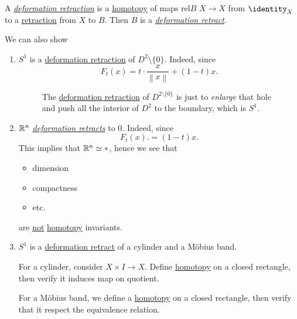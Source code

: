 \begin{prev}
	A \hyperref[def:deformation-retraction]{\emph{deformation retraction}} is a \hyperref[def:homotopy]{homotopy}
	of maps \(\mathrm{rel} B\) \(X\to X\) from \(\identity_X\) to a \hyperref[def:retraction]{retraction} from \(X\) to \(B\). Then \(B\) is a
	\hyperref[def:deformation-retraction]{\emph{deformation retract}}.
\end{prev}
\begin{eg}
	We can also show
	\begin{enumerate}
		\item \(S^1\) is a \hyperref[def:deformation-retraction]{deformation retraction} of \(D^{2}\setminus \{0\}\). Indeed, since
		      \[
			      F_t(x) = t\cdot \frac{x}{\left\lVert x\right\rVert } + (1 - t)x.
		      \]
		      \begin{figure}[H]
			      \centering
			      \caption{The \hyperref[def:deformation-retraction]{deformation retraction} of \(D^{2\setminus \{0\}}\) is just to
				      \emph{enlarge} that hole and push all the interior of \(D^2\) to the boundary, which is \(S^1\).}
			      \label{fig:eg:punched-circle}
		      \end{figure}
		\item \(\mathbb{\MakeUppercase{R}} ^n\) \hyperref[def:deformation-retraction]{\emph{deformation retracts}} to \(0\). Indeed, since
		      \[
			      F_t(x). = (1 - t)x.
		      \]
		      This implies that \(\mathbb{\MakeUppercase{R}} ^n\simeq *\), hence we see that
		      \begin{itemize}
			      \item dimension
			      \item compactness
			      \item etc.
		      \end{itemize}
		      are \underline{not} \hyperref[def:homotopy]{homotopy} invariants.
		\item \(S^1\) is a \hyperref[def:deformation-retraction]{deformation retract} of a cylinder and a Möbius band.
		      \par For a cylinder, consider \(X\times I \to X\). Define \hyperref[def:homotopy]{homotopy} on a closed rectangle, then
		      verify it induces map on quotient.
		      \par For a Möbius band, we define a \hyperref[def:homotopy]{homotopy} on a closed rectangle, then verify
		      that it respect the equivalence relation.


\end{enumerate}
\end{eg}
